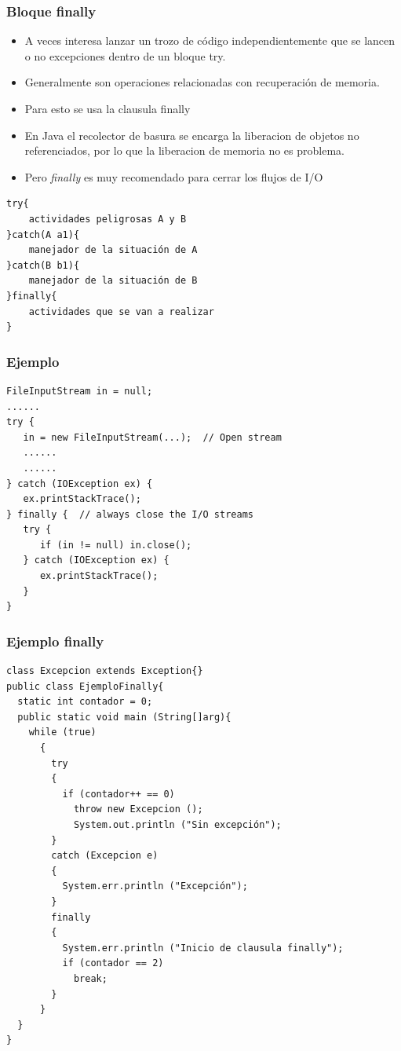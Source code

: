 \documentclass{beamer}
\begin{document}
\begin{frame}[fragile]
\frametitle{Bloque finally}
\begin{small}
\begin{itemize}[<+->]
\item A veces interesa lanzar un trozo de código independientemente que se lancen o no excepciones dentro de un bloque try.
\item Generalmente son operaciones relacionadas con recuperación de memoria.
\item Para esto se usa la clausula \alert{finally}
\item En Java el recolector de basura se encarga la liberacion de objetos no referenciados, por lo que la liberacion de memoria no es problema.
\item Pero \emph{finally} es muy recomendado para cerrar los flujos de I/O
\end{itemize}
\pause
\begin{verbatim}
try{
    actividades peligrosas A y B
}catch(A a1){
    manejador de la situación de A
}catch(B b1){
    manejador de la situación de B
}finally{
    actividades que se van a realizar
}
\end{verbatim}
\end{small}
\end{frame}

\begin{frame}[fragile]
\frametitle{Ejemplo}
\begin{verbatim}
FileInputStream in = null;
......  
try {
   in = new FileInputStream(...);  // Open stream
   ......
   ......
} catch (IOException ex) {
   ex.printStackTrace();
} finally {  // always close the I/O streams
   try {
      if (in != null) in.close();
   } catch (IOException ex) {
      ex.printStackTrace();
   }
}
\end{verbatim}
\end{frame}


\begin{frame}[fragile]
\frametitle{Ejemplo finally}
\begin{scriptsize}
\begin{verbatim}
class Excepcion extends Exception{}
public class EjemploFinally{
  static int contador = 0;
  public static void main (String[]arg){
    while (true)
      {
        try
        {
          if (contador++ == 0)
            throw new Excepcion ();
            System.out.println ("Sin excepción");
        }
        catch (Excepcion e)
        {
          System.err.println ("Excepción");
        }
        finally
        {
          System.err.println ("Inicio de clausula finally");
          if (contador == 2)
            break;
        }
      }
  }
}
\end{verbatim}
\end{scriptsize}
\end{frame}
\end{document}
